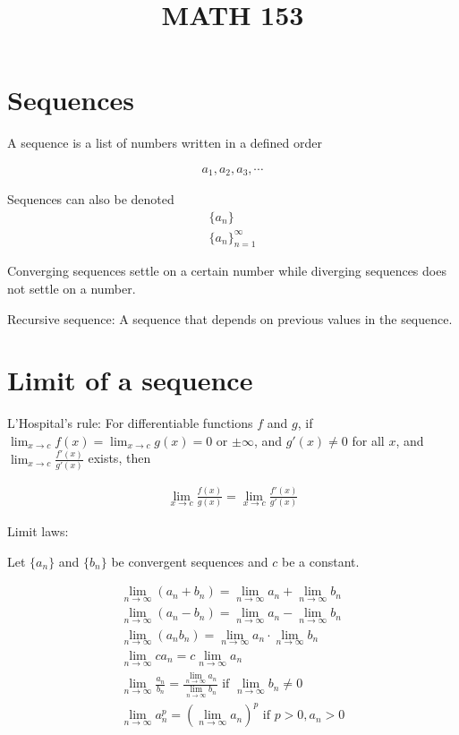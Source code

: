 \documentclass{article}
\title{MATH 153}
\begin{document}
\section{Sequences}

A sequence is a list of numbers written in a defined order

\begin{gather*}
    a_1, a_2, a_3, \cdots
\end{gather*}

Sequences can also be denoted
\begin{gather*}
    \{a_n\} \\
    \{a_n\}^\infty_{n=1}
\end{gather*}

Converging sequences settle on a certain number while diverging sequences does not settle on a number.

Recursive sequence: A sequence that depends on previous values in the sequence.

\section{Limit of a sequence}

L'Hospital's rule: For differentiable functions $f$ and $g$, if $\lim_{x \to c} f(x) = \lim_{x \to c} g(x) = 0$ or $\pm \infty$, and $g'(x) \neq 0$ for all $x$, and $\lim_{x \to c} \frac{f'(x)}{g'(x)}$ exists, then

\begin{gather*}
    \lim_{x \to c} \frac{f(x)}{g(x)} = \lim_{x \to c} \frac{f'(x)}{g'(x)}
\end{gather*}

Limit laws:

Let $\{a_n\}$ and $\{b_n\}$ be convergent sequences and $c$ be a constant.

\begin{gather*}
\lim_{n \to \infty} (a_n + b_n) = \lim_{n \to \infty} a_n + \lim_{n \to \infty} b_n \\
\lim_{n \to \infty} (a_n - b_n) = \lim_{n \to \infty} a_n - \lim_{n \to \infty} b_n \\
\lim_{n \to \infty} (a_n b_n) = \lim_{n \to \infty} a_n \cdot \lim_{n \to \infty} b_n \\
\lim_{n \to \infty} ca_n = c \lim_{n \to \infty} a_n \\
\lim_{n \to \infty} \frac{a_n}{b_n} = \frac{\lim_{n \to \infty} a_n}{\lim_{n \to \infty} b_n} \text{ if } \lim_{n \to \infty} b_n \neq 0 \\
\lim_{n \to \infty} a^p_n = \left( \lim_{n \to \infty} a_n \right)^p \text{ if } p > 0, a_n > 0
\end{gather*}
\end{document}
